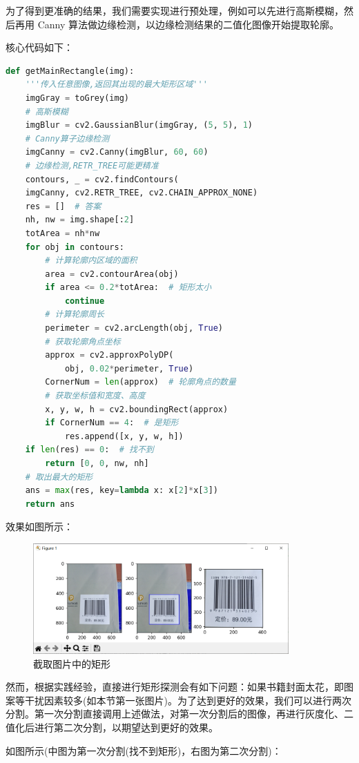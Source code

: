 \documentclass{ctexart}
\begin{document}
为了得到更准确的结果，我们需要实现进行预处理，例如可以先进行高斯模糊，然后再用 Canny 算法做边缘检测，以边缘检测结果的二值化图像开始提取轮廓。

核心代码如下：

\begin{lstlisting}[language=python]
def getMainRectangle(img):
    '''传入任意图像,返回其出现的最大矩形区域'''
    imgGray = toGrey(img)
    # 高斯模糊
    imgBlur = cv2.GaussianBlur(imgGray, (5, 5), 1)
    # Canny算子边缘检测
    imgCanny = cv2.Canny(imgBlur, 60, 60)
    # 边缘检测,RETR_TREE可能更精准
    contours, _ = cv2.findContours(
    imgCanny, cv2.RETR_TREE, cv2.CHAIN_APPROX_NONE)
    res = []  # 答案
    nh, nw = img.shape[:2]
    totArea = nh*nw
    for obj in contours:
        # 计算轮廓内区域的面积
        area = cv2.contourArea(obj)
        if area <= 0.2*totArea:  # 矩形太小
            continue
        # 计算轮廓周长
        perimeter = cv2.arcLength(obj, True)
        # 获取轮廓角点坐标
        approx = cv2.approxPolyDP(
            obj, 0.02*perimeter, True)
        CornerNum = len(approx)  # 轮廓角点的数量
        # 获取坐标值和宽度、高度
        x, y, w, h = cv2.boundingRect(approx)
        if CornerNum == 4:  # 是矩形
            res.append([x, y, w, h])
    if len(res) == 0:  # 找不到
        return [0, 0, nw, nh]
    # 取出最大的矩形
    ans = max(res, key=lambda x: x[2]*x[3])  
    return ans
\end{lstlisting}

效果如图所示：

\begin{figure}[H]
    \centering
    \includegraphics[height=120pt]{sample_graphSplit}
    \caption{截取图片中的矩形}
\end{figure}

然而，根据实践经验，直接进行矩形探测会有如下问题：如果书籍封面太花，即图案等干扰因素较多(如本节第一张图片)。为了达到更好的效果，我们可以进行两次分割。第一次分割直接调用上述做法，对第一次分割后的图像，再进行灰度化、二值化后进行第二次分割，以期望达到更好的效果。

如图所示(中图为第一次分割(找不到矩形)，右图为第二次分割)：
\end{document}
